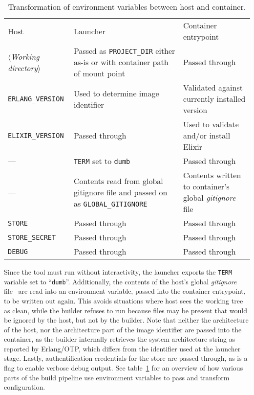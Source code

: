 \begin{table}[h]
  \setlength{\tabcolsep}{10pt}
  \centering
  \begin{tabularx}{\textwidth}{l X X}
    Host & Launcher & Container entrypoint \\
    \hhline{===}
    $\langle$\emph{Working directory}$\rangle$ &
      Passed as \lstinline|PROJECT_DIR| \newline
      either as-is or with container path of mount point &
      Passed through \\
    \hline
    \lstinline|ERLANG_VERSION| &
      Used to determine \newline
      image identifier &
      Validated against \newline
      currently installed version \\
    \hline
    \lstinline|ELIXIR_VERSION| &
      Passed through &
      Used to validate and/or \newline
      install Elixir \\
    \hline
    --- &
      \lstinline|TERM| set to \lstinline|dumb| &
      Passed through \\
    \hline
    --- &
      Contents read from global gitignore
      file and passed on as \lstinline|GLOBAL_GITIGNORE| &
      Contents written to \newline
      container's global \newline
      \emph{gitignore} file \\
    \hline
    \lstinline|STORE| & Passed through & Passed through \\
    \hline
    \lstinline|STORE_SECRET| & Passed through & Passed through \\
    \hline
    \lstinline|DEBUG| & Passed through & Passed through \\
    \hline
  \end{tabularx}
  \caption{Transformation of environment variables between host and container.}\label{table:envvars}
\end{table}

Since the tool must run without interactivity, the launcher exports the \lstinline|TERM| variable set to ``\lstinline|dumb|''. Additionally, the contents of the host's global \emph{gitignore} file~\cite{man:git} are read into an environment variable, passed into the container entrypoint, to be written out again. This avoids situations where host sees the working tree as clean, while the builder refuses to run because files may be present that would be ignored by the host, but not by the builder. Note that neither the architecture of the host, nor the architecture part of the image identifier are passed into the container, as the builder internally retrieves the system architecture string as reported by Erlang/OTP, which differs from the identifier used at the launcher stage. Lastly, authentification credentials for the store are passed through, as is a flag to enable verbose debug output. See table~\ref{table:envvars} for an overview of how various parts of the build pipeline use environment variables to pass and transform configuration.

